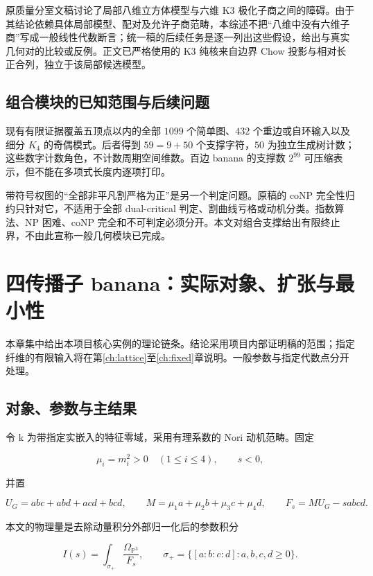 \documentclass[11pt,a4paper,oneside]{ctexrep}
\theoremstyle{cnplain}
\theoremstyle{definition}
\theoremstyle{remark}
\begin{document}
原质量分室文稿讨论了局部八维立方体模型与六维 K3 极化子商之间的障碍。由于其结论依赖具体局部模型、配对及允许子商范畴，本综述不把``八维中没有六维子商''写成一般线性代数断言；统一稿的后续任务是逐一列出这些假设，给出与真实几何对的比较或反例。正文已严格使用的 K3 纯核来自边界 Chow 投影与相对长正合列，独立于该局部候选模型。

\section{组合模块的已知范围与后续问题}
现有有限证据覆盖五顶点以内的全部 $1099$ 个简单图、$432$ 个重边或自环输入以及细分 $K_4$ 的奇偶模式。后者得到 $59=9+50$ 个支撑字符，$50$ 为独立生成树计数；这些数字计数角色，不计数周期空间维数。百边 banana 的支撑数 $2^{99}$ 可压缩表示，但不能在多项式长度内逐项打印。

带符号权图的``全部非平凡割严格为正''是另一个判定问题。原稿的 coNP 完全性归约只针对它，不适用于全部 dual-critical 判定、割曲线亏格或动机分类。指数算法、NP 困难、coNP 完全和不可判定必须分开。本文对组合支撑给出有限终止界，不由此宣称一般几何模块已完成。


\chapter{四传播子 banana：实际对象、扩张与最小性}\label{ch:core}
本章集中给出本项目核心实例的理论链条。结论采用项目内部证明稿的范围；指定纤维的有限输入将在第\ref{ch:lattice}至\ref{ch:fixed}章说明。一般参数与指定代数点分开处理。
\section{对象、参数与主结果}\label{sec:core:1}

令 k 为带指定实嵌入的特征零域，采用有理系数的 Nori 动机范畴。固定

\begin{equation}
\mu_i=m_i^2>0\quad(1\leq i\leq4),\qquad s<0,
\end{equation}

并置

\begin{equation}
U_G=abc+abd+acd+bcd,\qquad
 M=\mu_1a+\mu_2b+\mu_3c+\mu_4d,\qquad
 F_s=M U_G-sabcd.                                      \label{eq:core:1.1}
\end{equation}

本文的物理量是去除动量积分外部归一化后的参数积分

\begin{equation}
I(s)=\int_{\sigma_+}\frac{\Omega_{\mathbb P^3}}{F_s},
 \qquad \sigma_+=\{[a:b:c:d]:a,b,c,d\geq0\}.             \label{eq:core:1.2}
\end{equation}
\end{document}
